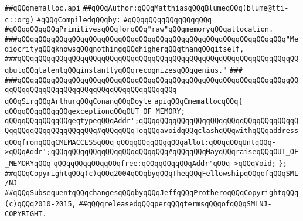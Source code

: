 \label{src/lib/c-glue-lib/ram/memalloc.api}
\verb|##qQQqmemalloc.api|\newline
\verb|##qQQqAuthor:qQQqMatthiasqQQqBlumeqQQq(blume@tti-c::org)|\newline
\newline
\verb|#qQQqCompiledqQQqby:|\newline
\verb|#qQQqqQQqqQQqqQQqqQQq|\newline
\newline
\newline
\verb|#qQQqqQQqqQQqPrimitivesqQQqforqQQq"raw"qQQqmemoryqQQqallocation.|\newline
\newline
\newline
\newline
\verb|###qQQqqQQqqQQqqQQqqQQqqQQqqQQqqQQqqQQqqQQqqQQqqQQqqQQqqQQqqQQqqQQq"MediocrityqQQqknowsqQQqnothingqQQqhigherqQQqthanqQQqitself,|\newline
\verb|###qQQqqQQqqQQqqQQqqQQqqQQqqQQqqQQqqQQqqQQqqQQqqQQqqQQqqQQqqQQqqQQqqQQqbutqQQqtalentqQQqinstantlyqQQqrecognizesqQQqgenius."|\newline
\verb|###|\newline
\verb|###qQQqqQQqqQQqqQQqqQQqqQQqqQQqqQQqqQQqqQQqqQQqqQQqqQQqqQQqqQQqqQQqqQQqqQQqqQQqqQQqqQQqqQQqqQQqqQQqqQQqqQQqqQQq--qQQqSirqQQqArthurqQQqConanqQQqDoyle|\newline
\newline
\newline
\newline
\verb|apiqQQqCmemallocqQQq{|\newline
\newline
\verb|qQQqqQQqqQQqqQQqexceptionqQQqOUT_OF_MEMORY;|\newline
\newline
\verb|qQQqqQQqqQQqqQQqeqtypeqQQqAddr';qQQqqQQqqQQqqQQqqQQqqQQqqQQqqQQqqQQqqQQqqQQqqQQqqQQqqQQqqQQq#qQQqqQQqToqQQqavoidqQQqclashqQQqwithqQQqaddressqQQqfromqQQqCMEMACCESSqQQq|\newline
\newline
\verb|qQQqqQQqqQQqqQQqallot:qQQqqQQqUntqQQq->qQQqAddr';qQQqqQQqqQQqqQQqqQQqqQQqqQQq#qQQqqQQqMayqQQqraiseqQQqOUT_OF_MEMORYqQQq|\newline
\verb|qQQqqQQqqQQqqQQqfree:qQQqqQQqqQQqAddr'qQQq->qQQqVoid;|\newline
\verb|};|\newline
\newline
\newline
\verb|##qQQqCopyrightqQQq(c)qQQq2004qQQqbyqQQqTheqQQqFellowshipqQQqofqQQqSML/NJ|\newline
\verb|##qQQqSubsequentqQQqchangesqQQqbyqQQqJeffqQQqProtheroqQQqCopyrightqQQq(c)qQQq2010-2015,|\newline
\verb|##qQQqreleasedqQQqperqQQqtermsqQQqofqQQqSMLNJ-COPYRIGHT.|\newline

